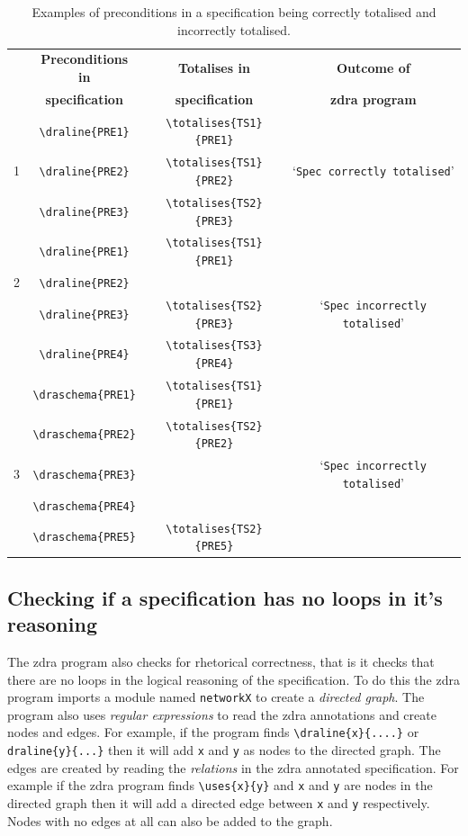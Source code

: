 \begin{table}[H]
\begin{tabular}{|c|c|c|c|}
\hline
& \textbf{Preconditions in} & \textbf{Totalises in} & \textbf{Outcome of} \\
& \textbf{specification} & \textbf{specification} & \textbf{\gls{zdra} program} \\
\hline
\hline
& \verb|\draline{PRE1}| & \verb|\totalises{TS1}{PRE1}| & \\
1 & \verb|\draline{PRE2}| & \verb|\totalises{TS1}{PRE2}| & `\texttt{Spec correctly totalised}' \\
& \verb|\draline{PRE3}| & \verb|\totalises{TS2}{PRE3}|& \\
\hline
& \verb|\draline{PRE1}| & \verb|\totalises{TS1}{PRE1}| &  \\
2 & \verb|\draline{PRE2}| & & \\
& \verb|\draline{PRE3}| & \verb|\totalises{TS2}{PRE3}|& `\texttt{Spec incorrectly totalised}' \\
& \verb|\draline{PRE4}| & \verb|\totalises{TS3}{PRE4}|& \\
\hline
& \verb|\draschema{PRE1}| & \verb|\totalises{TS1}{PRE1}| &  \\
 & \verb|\draschema{PRE2}| & \verb|\totalises{TS2}{PRE2}| & \\
3 & \verb|\draschema{PRE3}| & & `\texttt{Spec incorrectly totalised}' \\
& \verb|\draschema{PRE4}| & & \\
& \verb|\draschema{PRE5}| & \verb|\totalises{TS2}{PRE5}|  & \\
\hline
\end{tabular}
\caption{\label{tab:totalisecorrect} Examples of preconditions in a specification being correctly totalised and incorrectly totalised.}
\end{table}

\subsection{Checking if a specification has no loops in it's reasoning}
\label{subsec:loops}

The \gls{zdra} program also checks for rhetorical correctness, that is it checks that there are no loops in the logical reasoning of the specification. To do this the \gls{zdra} program imports a module named \texttt{networkX} to create a \emph{directed graph}. The program also uses \emph{regular expressions} to read the \gls{zdra} annotations and create nodes and edges. For example, if the program finds \verb|\draline{x}{....}| or \verb|draline{y}{...}| then it will add \texttt{x} and \texttt{y} as nodes to the directed graph. The edges are created by reading the \emph{relations} in the \gls{zdra} annotated specification. For example if the \gls{zdra} program finds \verb|\uses{x}{y}| and \texttt{x} and \texttt{y} are nodes in the directed graph then it will add a directed edge between \texttt{x} and \texttt{y} respectively. Nodes with no edges at all can also be added to the graph.

